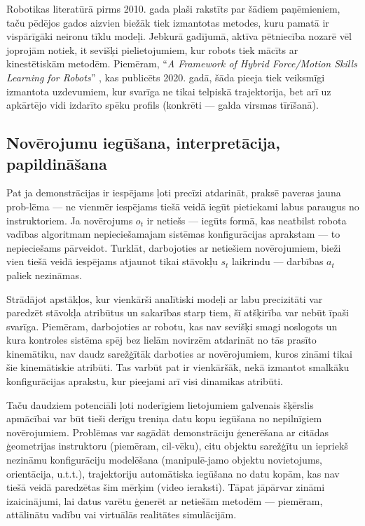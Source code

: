 \documentclass[12pt, a4paper]{article}
\numberwithin{equation}{section} %
\begin{document}
Robotikas literatūrā pirms 2010. gada \cite{billard2008handbook} plaši rakstīts par šādiem paņēmieniem, taču pēdējos gados aizvien biežāk tiek izmantotas metodes, kuru pamatā ir vispārīgāki neironu tīklu modeļi. Jebkurā gadījumā, aktīva pētniecība nozarē vēl joprojām notiek, it sevišķi pielietojumiem, kur robots tiek mācīts ar kinestētiskām metodēm. Piemēram, ``\textit{A Framework of Hybrid Force/Motion Skills Learning for Robots}'' \cite{wang2020framework}, kas publicēts 2020. gadā, šāda pieeja tiek veiksmīgi izmantota uzdevumiem, kur svarīga ne tikai telpiskā trajektorija, bet arī uz apkārtējo vidi izdarīto spēku profils (konkrēti --- galda virsmas tīrīšanā).

\subsection{Novērojumu iegūšana, interpretācija, papildināšana}

Pat ja demonstrācijas ir iespējams ļoti precīzi atdarināt, praksē paveras jauna prob-lēma --- ne vienmēr iespējams tiešā veidā iegūt pietiekami labus paraugus no instruktoriem. Ja novērojums $o_t$ ir netiešs --- iegūts formā, kas neatbilst robota vadības algoritmam nepieciešamajam sistēmas konfigurācijas aprakstam --- to nepieciešams pārveidot. Turklāt, darbojoties ar netiešiem novērojumiem, bieži vien tiešā veidā iespējams atjaunot tikai stāvokļu $s_t$ laikrindu --- darbības $a_t$ paliek nezināmas.

Strādājot apstākļos, kur vienkārši analītiski modeļi ar labu precizitāti var paredzēt stāvokļa atribūtus un sakarības starp tiem, šī atšķirība var nebūt īpaši svarīga. Piemēram, darbojoties ar robotu, kas nav sevišķi smagi noslogots un kura kontroles sistēma spēj bez lielām novirzēm atdarināt no tās prasīto kinemātiku, nav daudz sarežģītāk darboties ar novērojumiem, kuros zināmi tikai šie kinemātiskie atribūti. Tas varbūt pat ir vienkāršāk, nekā izmantot smalkāku konfigurācijas aprakstu, kur pieejami arī visi dinamikas atribūti. 

Taču daudziem potenciāli ļoti noderīgiem lietojumiem galvenais šķērslis apmācībai var būt tieši derīgu treniņa datu kopu iegūšana no nepilnīgiem novērojumiem. Problēmas var sagādāt demonstrāciju ģenerēšana ar citādas ģeometrijas instruktoru (piemēram, cil-vēku), citu objektu sarežģītu un iepriekš nezināmu konfigurāciju modelēšana (manipulē-jamo objektu novietojums, orientācija, u.t.t.), trajektoriju automātiska iegūšana no datu kopām, kas nav tiešā veidā paredzētas šim mērķim (video ieraksti). Tāpat jāpārvar zināmi izaicinājumi, lai datus varētu ģenerēt ar netiešām metodēm --- piemēram, attālinātu vadību vai virtuālās realitātes simulācijām.
\end{document}

